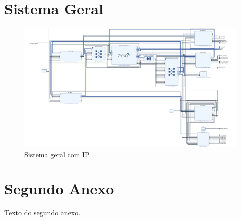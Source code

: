 \begin{anexosenv}

\partanexos

\chapter{Sistema Geral}
\begin{figure}[h]
	\centering
	\includegraphics[keepaspectratio=true,scale=0.32, angle=90]{figuras/base-zybo.png}
	\caption{Sistema geral com IP}
	\label{sitemageral}
\end{figure}


\chapter{Segundo Anexo}

Texto do segundo anexo.

\end{anexosenv}

